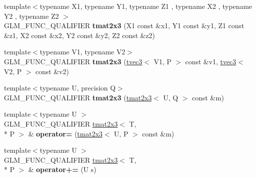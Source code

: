 \begin{DoxyCompactItemize}
\item 
\hypertarget{structglm_1_1detail_1_1tmat2x3_a4314c8e147d0c2d536781f1743787ab0}{{\footnotesize template$<$typename X1, typename Y1, typename Z1 , typename X2 , typename Y2 , typename Z2 $>$ }\\G\-L\-M\-\_\-\-F\-U\-N\-C\-\_\-\-Q\-U\-A\-L\-I\-F\-I\-E\-R {\bfseries tmat2x3} (X1 const \&x1, Y1 const \&y1, Z1 const \&z1, X2 const \&x2, Y2 const \&y2, Z2 const \&z2)}\label{structglm_1_1detail_1_1tmat2x3_a4314c8e147d0c2d536781f1743787ab0}

\item 
\hypertarget{structglm_1_1detail_1_1tmat2x3_a883732d6b9178b86a9e5d10483fb6b92}{{\footnotesize template$<$typename V1, typename V2$>$ }\\G\-L\-M\-\_\-\-F\-U\-N\-C\-\_\-\-Q\-U\-A\-L\-I\-F\-I\-E\-R {\bfseries tmat2x3} (\hyperlink{structglm_1_1detail_1_1tvec3}{tvec3}$<$ V1, P $>$ const \&v1, \hyperlink{structglm_1_1detail_1_1tvec3}{tvec3}$<$ V2, P $>$ const \&v2)}\label{structglm_1_1detail_1_1tmat2x3_a883732d6b9178b86a9e5d10483fb6b92}

\item 
\hypertarget{structglm_1_1detail_1_1tmat2x3_a16af68f7f9699db992854c79210d8f32}{{\footnotesize template$<$typename U, precision Q$>$ }\\G\-L\-M\-\_\-\-F\-U\-N\-C\-\_\-\-Q\-U\-A\-L\-I\-F\-I\-E\-R {\bfseries tmat2x3} (\hyperlink{structglm_1_1detail_1_1tmat2x3}{tmat2x3}$<$ U, Q $>$ const \&m)}\label{structglm_1_1detail_1_1tmat2x3_a16af68f7f9699db992854c79210d8f32}

\item 
\hypertarget{structglm_1_1detail_1_1tmat2x3_a1c28fce0a5ae7b18120851f7a44f9448}{{\footnotesize template$<$typename U $>$ }\\G\-L\-M\-\_\-\-F\-U\-N\-C\-\_\-\-Q\-U\-A\-L\-I\-F\-I\-E\-R \hyperlink{structglm_1_1detail_1_1tmat2x3}{tmat2x3}$<$ T, \\*
P $>$ \& {\bfseries operator=} (\hyperlink{structglm_1_1detail_1_1tmat2x3}{tmat2x3}$<$ U, P $>$ const \&m)}\label{structglm_1_1detail_1_1tmat2x3_a1c28fce0a5ae7b18120851f7a44f9448}

\item 
\hypertarget{structglm_1_1detail_1_1tmat2x3_a4cc0ac05c7c7c0ca0922739828ea087e}{{\footnotesize template$<$typename U $>$ }\\G\-L\-M\-\_\-\-F\-U\-N\-C\-\_\-\-Q\-U\-A\-L\-I\-F\-I\-E\-R \hyperlink{structglm_1_1detail_1_1tmat2x3}{tmat2x3}$<$ T, \\*
P $>$ \& {\bfseries operator+=} (U s)}\label{structglm_1_1detail_1_1tmat2x3_a4cc0ac05c7c7c0ca0922739828ea087e}


\end{DoxyCompactItemize}
